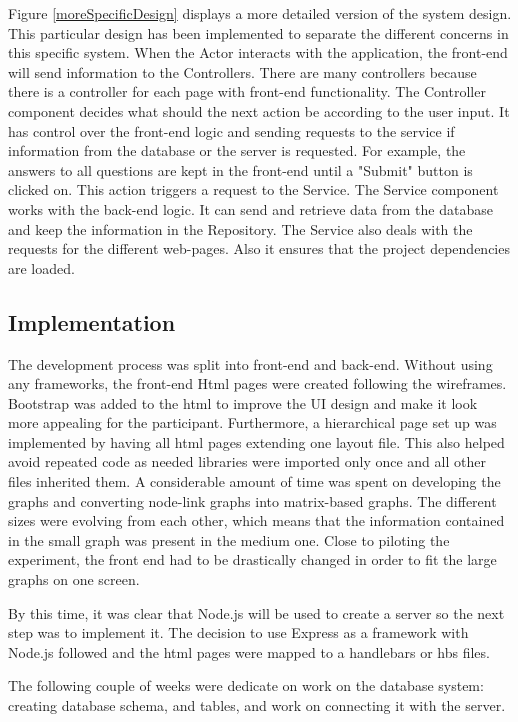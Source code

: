 \documentclass{l4proj}
\begin{document}
Figure \ref{moreSpecificDesign} displays a more detailed version of the system design. This particular design has been implemented to separate the different concerns in this specific system. When the Actor interacts with the application, the front-end will send information to the Controllers. There are many controllers because there is a controller for each page with front-end functionality. The Controller component decides what should the next action be according to the user input. It has control over the front-end logic and sending requests to the service if information from the database or the server is requested. For example, the answers to all questions are kept in the front-end until a "Submit" button is clicked on. This action triggers a request to the Service. The Service component works with the back-end logic. It can send and retrieve data from the database and keep the information in the Repository. The Service also deals with the requests for the different web-pages. Also it ensures that the project dependencies are loaded.   

\subsection{Implementation}
The development process was split into front-end and back-end. Without using any frameworks, the front-end Html pages were created following the wireframes. Bootstrap was added to the html to improve the UI design and make it look more appealing for the participant. Furthermore, a hierarchical page set up was implemented by having all html pages extending one layout file. This also helped avoid repeated code as needed libraries were imported only once and all other files inherited them. A considerable amount of time was spent on developing the graphs and converting node-link graphs into matrix-based graphs. The different sizes were evolving from each other, which means that the information contained in the small graph was present in the medium one. Close to piloting the experiment, the front end had to be drastically changed in order to fit the large graphs on one screen.

By this time, it was clear that Node.js will be used to create a server so the next step was to implement it. The decision to use Express as a framework with Node.js followed and the html pages were mapped to a handlebars or hbs files. 

The following couple of weeks were dedicate on work on the database system: creating database schema, and tables, and work on connecting it with the server. 
\end{document}
